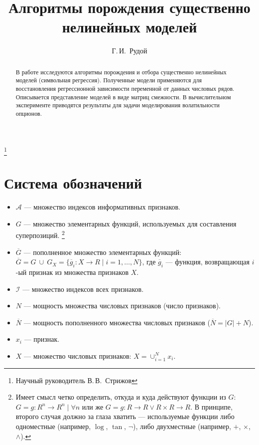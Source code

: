 \documentclass[12pt,a4paper]{amsart}
\begin{document}
\pagestyle{plain}

\title{Алгоритмы порождения существенно нелинейных моделей}
\author{Г.\,И.~Рудой}
\address{Московский физико-технический институт, ФУПМ, каф. <<Интеллектуальные системы>>}
\thanks{Научный руководитель В.\,В.~Стрижов}

\begin{abstract}
  В работе исследуются алгоритмы порождения и отбора существенно нелинейных моделей (символьная регрессия). Полученные модели применяются для восстановления регрессионной зависимости переменной от данных числовых рядов. Описывается представление моделей в виде матриц смежности. В вычислительном эксперименте приводятся результаты для задачи моделирования волатильности опционов.
\end{abstract}

\maketitle

\section{Система обозначений}

\begin{itemize}
  \item $ \mathcal{A} $ --- множество индексов информативных признаков.
  \item $ G $ --- множество элементарных функций, используемых для составления суперпозиций.
	\footnote{Имеет смысл четко определить, откуда и куда действуют функции из $G$: $G = { g : R^n \to R^n \mid \forall n }$
		или же $ G = { g : R \to R \lor R \times R \to R} $. В принципе, второго случая должно за глаза хватить ---
		используемые функции либо одноместные (например, $\log$, $\tan$, $\neg$), либо двухместные (например, $+$, $\times$, $\land$).}
  \item $ \overline{G} $ --- пополненное множество элементарных функций:
	$ \overline{G} = G\ \cup\ G_X = \{ \overline{g}_i : X \to R \mid i = 1, \dots, N\} $,
	где $\overline{g}_i$ --- функция, возвращающая $i$-ый признак из множества признаков $X$.
  \item $ \mathcal{I} $ --- множество индексов всех признаков.
  \item $ N $ --- мощность множества числовых признаков (число признаков).
  \item $ \overline{N} $ --- мощность пополненного множества числовых признаков ($\overline{N} = |G| + N$).
  \item $ x_i $ --- признак.
  \item $ X $ --- множество числовых признаков: $ X = \cup_{i = 1}^N {x_i}$.
\end{itemize}
\end{document}
